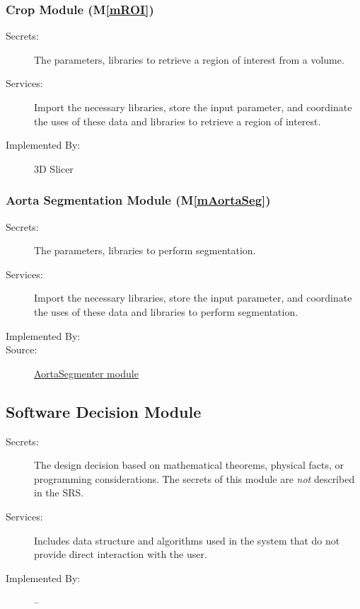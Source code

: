 \documentclass[12pt, titlepage]{article}
\newcommand{\mref}[1]{M\ref{#1}}
\begin{document}
\subsubsection{Crop Module (\mref{mROI})}
\begin{description}
\item[Secrets:] The parameters, libraries to retrieve a region of interest from a volume.
\item[Services:] Import the necessary libraries, store the input parameter, and coordinate the uses of these data and libraries to retrieve a region of interest.
\item[Implemented By:] 3D Slicer
\end{description}

\subsubsection{Aorta Segmentation Module (\mref{mAortaSeg})}
\begin{description}
\item[Secrets:] The parameters, libraries to perform segmentation.
\item[Services:] Import the necessary libraries, store the input parameter, and coordinate the uses of these data and libraries to perform segmentation.
\item[Implemented By:] \progname
\item[Source:] \href{https://joviel25.github.io/AortaGR-design-document/AortaGeomReconDisplayModuleLib.html#module-AortaSegmenter}{AortaSegmenter module}
\end{description}

\subsection{Software Decision Module}

\begin{description}
\item[Secrets:] The design decision based on mathematical theorems, physical
  facts, or programming considerations. The secrets of this module are
  \emph{not} described in the SRS.
\item[Services:] Includes data structure and algorithms used in the system that
  do not provide direct interaction with the user. 
\item[Implemented By:] --
\end{description}
\end{document}
